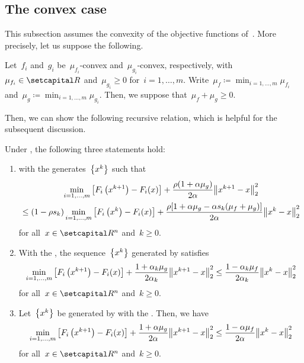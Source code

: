 \documentclass[../../main]{subfiles}
\begin{document}
\subsection{The convex case}
This subsection assumes the convexity of the objective functions of~.
More precisely, let us suppose the following.
\begin{assumption} 
    Let~$f_i$ and~$g_i$ be~$\mu_{f_i}$-convex and~$\mu_{g_i}$-convex, respectively, with~$\mu_{f_i} \in \setR$ and~$\mu_{g_i} \ge 0$ for~$i = 1, \dots, m$.
    Write~$\mu_f \coloneqq \min_{i = 1, \dots, m} \mu_{f_i}$ and~$\mu_g \coloneqq \min_{i = 1, \dots, m} \mu_{g_i}$.
    Then, we suppose that~$\mu_f + \mu_g \ge 0$.
\end{assumption}

Then, we can show the following recursive relation, which is helpful for the subsequent discussion.
\begin{lemma} 
    Under , the following three statements hold:
    \begin{enumerate}
        \item {} with the  generates~$\set*{x^k}$ such that
              \begin{multline}
                  \min_{i = 1, \dots, m} \left[F_i\left(x^{k + 1}\right) - F_i(x)\right] + \frac{\rho (1 + \alpha \mu_g)}{2 \alpha} \norm*{x^{k + 1} - x}_2^2 \\
                  \le (1 - \rho s_k) \min_{i = 1, \dots, m} \left[F_i\left(x^k\right) - F_i(x)\right] + \frac{\rho [1 + \alpha \mu_g - \alpha s_k (\mu_f + \mu_g)]}{2 \alpha} \norm*{x^k - x}_2^2
              \end{multline}
              for all~$x \in \setR^n$ and~$k \ge 0$. 
        \item With the , the sequence~$\set*{x^k}$ generated by  satisfies
              \begin{equation}
                  \min_{i = 1, \dots, m} \left[F_i\left(x^{k + 1}\right) - F_i(x)\right] + \frac{1 + \alpha_k \mu_g}{2 \alpha_k} \norm*{x^{k + 1} - x}_2^2 \le \frac{1 - \alpha_k \mu_f}{2 \alpha_k} \norm*{x^k - x}_2^2
              \end{equation}
              for all~$x \in \setR^n$ and~$k \ge 0$. 
        \item Let~$\set*{x^k}$ be generated by  with the .
              Then, we have
              \begin{equation}
                  \min_{i = 1, \dots, m} \left[F_i\left(x^{k + 1}\right) - F_i(x)\right] + \frac{1 + \alpha \mu_g}{2 \alpha} \norm*{x^{k + 1} - x}_2^2 \le \frac{1 - \alpha \mu_f}{2 \alpha} \norm*{x^k - x}_2^2
              \end{equation}
              for all~$x \in \setR^n$ and~$k \ge 0$. 
    \end{enumerate}
\end{lemma}
\end{document}

